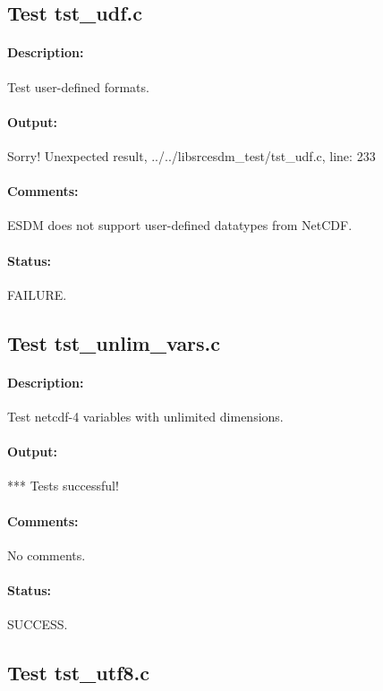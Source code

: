 \subsection{Test tst\_udf.c}

\paragraph{Description:} Test user-defined formats.

\paragraph{Output:} Sorry! Unexpected result, ../../libsrcesdm\_test/tst\_udf.c, line: 233

\paragraph{Comments:} ESDM does not support user-defined datatypes from NetCDF.

\paragraph{Status:} FAILURE.

\subsection{Test tst\_unlim\_vars.c}

\paragraph{Description:} Test netcdf-4 variables with unlimited dimensions.

\paragraph{Output:} *** Tests successful!

\paragraph{Comments:} No comments.

\paragraph{Status:} SUCCESS.

\subsection{Test tst\_utf8.c}

